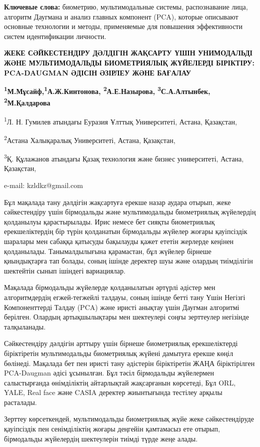 {\bfseries Ключевые слова:} биометрию, мультимодальные системы,
распознавание лица, алгоритм Даугмана и анализ главных компонент (PCA),
которые описывают основные технологии и методы, применяемые для
повышения эффективности систем идентификации личности.

{\bfseries ЖЕКЕ СӘЙКЕСТЕНДІРУ ДӘЛДІГІН ЖАҚСАРТУ ҮШІН УНИМОДАЛЬДІ ЖӘНЕ
МУЛЬТИМОДАЛЬДЫ БИОМЕТРИЯЛЫҚ ЖҮЙЕЛЕРДІ БІРІКТІРУ: PCA-DAUGMAN ӘДІСІН
ӘЗІРЛЕУ ЖӘНЕ БАҒАЛАУ}

{\bfseries \textsuperscript{1}М.Мұсайф,\textsuperscript{1}А.Ж.Кинтонова,
\textsuperscript{2}А.Е.Назырова, \textsuperscript{3}С.А.Алтынбек,
\textsuperscript{2}М.Қалдарова}

\textsuperscript{1}Л. Н. Гумилев атындағы Еуразия Ұлттық Университеті,
Астана, Қазақстан,

\textsuperscript{2}Астана Халықаралық Университеті, Астана, Қазақстан,

\textsuperscript{3}Қ. Құлажанов атындағы Қазақ технология және бизнес
университеті, Астана, Қазақстан,

e-mail: kzldkz@gmail.com

Бұл мақалада тану дәлдігін жақсартуға ерекше назар аудара отырып, жеке
сәйкестендіру үшін бірмодальды және мультимодальды биометриялық
жүйелердің қолданылуы қарастырылады. Ирис немесе бет сияқты биометриялық
ерекшеліктердің бір түрін қолданатын бірмодальды жүйелер жоғары
қауіпсіздік шаралары мен сабаққа қатысуды бақылауды қажет ететін
жерлерде кеңінен қолданылады. Танымалдылығына қарамастан, бұл жүйелер
бірнеше қиындықтарға тап болады, соның ішінде деректер шуы және олардың
тиімділігін шектейтін сынып ішіндегі вариациялар.

Мақалада бірмодальды жүйелерде қолданылатын әртүрлі әдістер мен
алгоритмдердің егжей-тегжейлі талдауы, соның ішінде бетті тану Үшін
Негізгі Компоненттерді Талдау (PCA) және иристі анықтау үшін Даугман
алгоритмі берілген. Олардың артықшылықтары мен шектеулері соңғы
зерттеулер негізінде талқыланады.

Сәйкестендіру дәлдігін арттыру үшін бірнеше биометриялық ерекшеліктерді
біріктіретін мультимодальды биометриялық жүйені дамытуға ерекше көңіл
бөлінеді. Мақалада бет пен иристі тану әдістерін біріктіретін ЖАҢА
біріктірілген PCA-Daugman әдісі ұсынылған. Бұл тәсіл бірмодальды
жүйелермен салыстырғанда өнімділіктің айтарлықтай жақсарғанын көрсетеді,
Бұл ORL, YALE, Real face және CASIA деректер жиынтығында тестілеу арқылы
расталады.

Зерттеу көрсеткендей, мультимодальды биометриялық жүйе жеке
сәйкестендіруде қауіпсіздік пен сенімділіктің жоғары деңгейін қамтамасыз
ете отырып, бірмодальды жүйелердің шектеулерін тиімді түрде жеңе алады.

